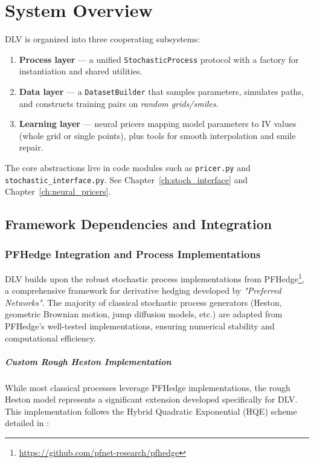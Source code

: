 	\chapter{System Overview}
	\label{ch:overview}
	DLV is organized into three cooperating subsystems:
	\begin{enumerate}[label=\textbf{S\arabic*}., leftmargin=*, nosep]
		\item \textbf{Process layer} — a unified \texttt{StochasticProcess} protocol with a factory for instantiation and shared utilities. 
		\item \textbf{Data layer} — a \texttt{DatasetBuilder} that samples parameters, simulates paths, and constructs training pairs on \emph{random grids/smiles}.
		\item \textbf{Learning layer} — neural pricers mapping model parameters to IV values (whole grid or single points), plus tools for smooth interpolation and smile repair.
	\end{enumerate}
	\noindent The core abstractions live in code modules such as \texttt{pricer.py} and \texttt{stochastic\_interface.py}. See Chapter~\ref{ch:stoch_interface} and Chapter~\ref{ch:neural_pricers}.
	
	\section{Framework Dependencies and Integration}
	\label{sec:framework-dependencies}
	
	\subsection{PFHedge Integration and Process Implementations}
	
	DLV builds upon the robust stochastic process implementations from PFHedge\footnote{\url{https://github.com/pfnet-research/pfhedge}}, a comprehensive framework for derivative hedging developed by \textit{"Preferred Networks"}. The majority of classical stochastic process generators (Heston, geometric Brownian motion, jump diffusion models, etc.) are adapted from PFHedge's well-tested implementations, ensuring numerical stability and computational efficiency.
	
	\paragraph{Custom Rough Heston Implementation}
	
	While most classical processes leverage PFHedge implementations, the rough Heston model represents a significant extension developed specifically for DLV. This implementation follows the Hybrid Quadratic Exponential (HQE) scheme detailed in \citet{Bertolo2024RoughHestonSchemes}:
	

